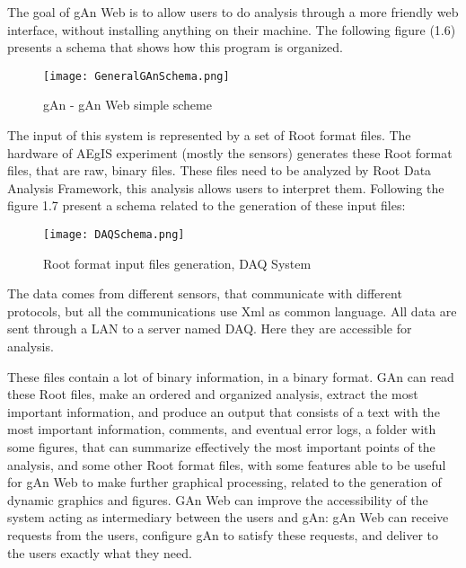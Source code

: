 The goal of gAn Web is to allow users to do analysis through a more friendly web interface, without installing anything on their machine. The following figure (1.6) presents a schema that shows how this program is organized.

\begin{figure}[H]
\centering
\texttt{[image: GeneralGAnSchema.png]} 
\caption{gAn - gAn Web simple scheme}
\end{figure}

The input of this system is represented by a set of Root format files. 
The hardware of AEgIS experiment (mostly the sensors) generates these Root format files, that are raw, binary files. These files need to be analyzed by Root Data Analysis Framework, this analysis allows users to interpret them. 
Following the figure 1.7 present a schema related to the generation of these input files:

\begin{figure}[H]
\centering
\texttt{[image: DAQSchema.png]} 
\caption{Root format input files generation, DAQ System}
\end{figure}

The data comes from different sensors, that communicate with different protocols, but all the communications use Xml as common language. All data are sent through a LAN to a server named DAQ. Here they are accessible for analysis. 

These files contain a lot of binary information, in a binary format. GAn can read these Root files, make an ordered and organized analysis, extract the most important information, and produce an output that consists of a text with the most important information, comments, and eventual error logs, a folder with some figures, that can summarize effectively the most important points of the analysis, and some other Root format files, with some features able to be useful  for gAn Web to make further graphical processing, related to the generation of dynamic graphics and figures. GAn Web can improve the accessibility of the system acting as intermediary between the users and gAn: gAn Web can receive requests from the users, configure gAn to satisfy these requests, and deliver to the users exactly what they need.
